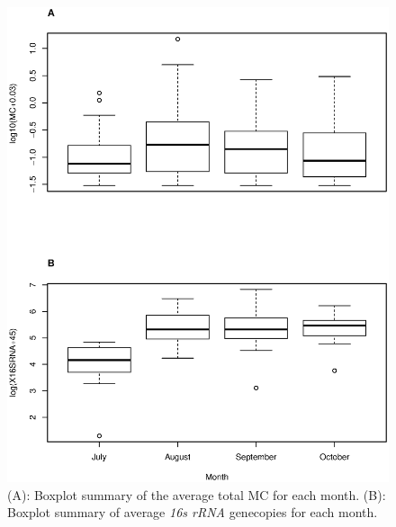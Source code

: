 \begin{figure}[!h]
\includegraphics[width=\textwidth]{figures/time4}
\caption{
(A): Boxplot summary of the average total MC for each month. 
(B): Boxplot summary of average \emph{16s rRNA} genecopies for each month.
}
\label{fig:time3}
\end{figure}

